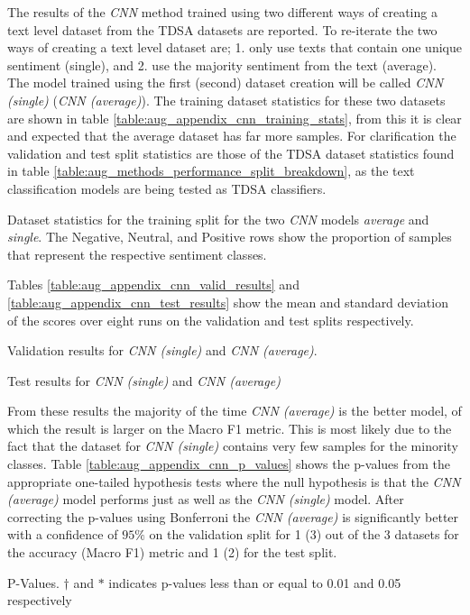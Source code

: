 The results of the \textit{CNN} method trained using two different ways of creating a text level dataset from the TDSA datasets are reported. To re-iterate the two ways of creating a text level dataset are; 1. only use texts that contain one unique sentiment (single), and 2. use the majority sentiment from the text (average). The model trained using the first (second) dataset creation will be called \textit{CNN (single)} (\textit{CNN (average)}). The training dataset statistics for these two datasets are shown in table \ref{table:aug_appendix_cnn_training_stats}, from this it is clear and expected that the average dataset has far more samples. For clarification the validation and test split statistics are those of the TDSA dataset statistics found in table \ref{table:aug_methods_performance_split_breakdown}, as the text classification models are being tested as TDSA classifiers.
\begin{table}[ht!]
    \centering
    
    \caption{Dataset statistics for the training split for the two \textit{CNN} models \textit{average} and \textit{single}. The Negative, Neutral, and Positive rows show the proportion of samples that represent the respective sentiment classes.}
    \label{table:aug_appendix_cnn_training_stats}
\end{table}

Tables \ref{table:aug_appendix_cnn_valid_results} and \ref{table:aug_appendix_cnn_test_results} show the mean and standard deviation of the scores over eight runs on the validation and test splits respectively.

\begin{table}[ht!]
    \centering
    
    \caption{Validation results for \textit{CNN (single)} and \textit{CNN (average)}.}
    \label{table:aug_appendix_cnn_valid_results}
\end{table}

\begin{table}[ht!]
    \centering
    
    \caption{Test results for \textit{CNN (single)} and \textit{CNN (average)}}
    \label{table:aug_appendix_cnn_test_results}
\end{table}

From these results the majority of the time \textit{CNN (average)} is the better model, of which the result is larger on the Macro F1 metric. This is most likely due to the fact that the dataset for \textit{CNN (single)} contains very few samples for the minority classes. Table \ref{table:aug_appendix_cnn_p_values} shows the p-values from the appropriate one-tailed hypothesis tests where the null hypothesis is that the \textit{CNN (average)} model performs just as well as the \textit{CNN (single)} model. After correcting the p-values using Bonferroni the \textit{CNN (average)} is significantly better with a confidence of $95\%$ on the validation split for 1 (3) out of the 3 datasets for the accuracy (Macro F1) metric and 1 (2) for the test split.   

\begin{table}[ht!]
    \centering
    
    \caption{P-Values. $\dagger$ and $\ast$ indicates p-values less than or equal to 0.01 and 0.05 respectively }
    \label{table:aug_appendix_cnn_p_values}
\end{table}